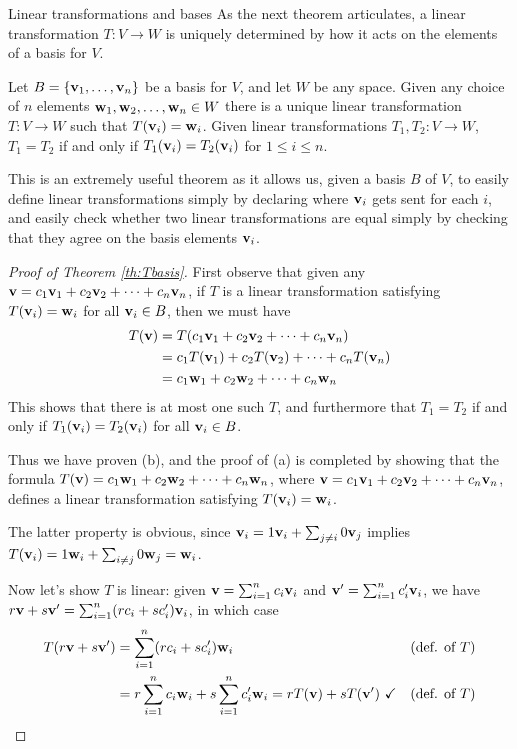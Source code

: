 \begin{frame}{Linear transformations and bases}
As the next theorem articulates, a linear transformation $T\colon V\rightarrow W$ is \alert{uniquely determined} by how it acts on the elements of a basis for $V$. 
\begin{theorem}\label{th:Tbasis}
Let $B=\{{\mathbf v}_1,\dots,{\mathbf v}_n\}$ be a basis for $V$, and let $W$ be any space. 
\bb[(a)]
\ii Given any choice of $n$ elements ${\mathbf w}_1,{\mathbf w}_2,\dots, {\mathbf w}_n\in W$ there is a \alert{unique} linear transformation $T\colon V\rightarrow W$ such that $T({\mathbf v}_i)={\mathbf w}_i$. 
\ii Given linear transformations $T_1,T_2\colon V\rightarrow W$, $T_1=T_2$ if and only if $T_1({\mathbf v}_i)=T_2({\mathbf v}_i)$ for $1\leq i\leq n$.  
\ee
\end{theorem}
\pause
This is an extremely useful theorem as it allows us, given a basis $B$ of $V$, to 
\bb[(i)]
\ii easily define linear transformations simply by declaring where ${\mathbf v}_i$ gets sent for each $i$, and 
\pause \ii easily check whether two linear transformations are equal simply by checking that they agree on the basis elements ${\mathbf v}_i$. 
\ee
\end{frame}
\begin{frame}
 \begin{proof}[Proof of Theorem \ref{th:Tbasis}]
 \footnotesize
 \pause 
 First observe that given any ${\mathbf v}=c_1{\mathbf v}_1+c_2{\mathbf v}_2+\cdots +c_n{\mathbf v}_n$, if $T$ is a linear transformation satisfying $T({\mathbf v}_i)={\mathbf w}_i$ for all ${\mathbf v}_i\in B$, then we must have 
 \begin{align*}
 T({\mathbf v})&=T(c_1{\mathbf v}_1+c_2{\mathbf v}_2+\cdots +c_n{\mathbf v}_n)\\
 &=c_1T({\mathbf v}_1)+c_2T({\mathbf v}_2)+\cdots +c_nT({\mathbf v}_n)\\
 &=c_1{\mathbf w}_1+c_2{\mathbf w}_2+\cdots +c_n{\mathbf w}_n
 \end{align*}
 This shows that there is \alert{at most} one such $T$, and furthermore that $T_1=T_2$ if and only if $T_1({\mathbf v}_i)=T_2({\mathbf v}_i)$ for all ${\mathbf v}_i\in B$. 
 \pause
 
 Thus we have proven (b), and the proof of (a) is completed by showing that the formula $T({\mathbf v})=c_1{\mathbf w}_1+c_2{\mathbf w}_2+\cdots +c_n{\mathbf w}_n$, where ${\mathbf v}=c_1{\mathbf v}_1+c_2{\mathbf v}_2+\cdots +c_n{\mathbf v}_n$, defines a linear transformation satisfying $T({\mathbf v}_i)={\mathbf w}_i$. 
 \pause
 
 The latter property is obvious, since ${\mathbf v}_i=1{\mathbf v}_i+\sum_{j\ne i}0{\mathbf v}_j$ implies $T({\mathbf v}_i)=1{\mathbf w}_i+\sum_{i\ne j}0{\mathbf w}_j={\mathbf w}_i$.
 \pause
 
 Now let's show $T$ is linear: given ${\mathbf v}=\sum_{i=1}^n c_i{\mathbf v}_i$ and ${\mathbf v}'=\sum_{i=1}^nc_i'{\mathbf v}_i$, we have $r{\mathbf v}+s{\mathbf v}'=\sum_{i=1}^n(rc_i+sc_i'){\mathbf v}_i$, in which case 
 \begin{align*}\setlength{\topsep}{0pt}
 T(r\boldv+s\boldv')&=\sum_{i=1}^n(rc_i+sc_i')\boldw_i &\text{(def. of $T$)}\\
 &=r\sum_{i=1}^n c_i\boldw_i+s\sum_{i=1}^nc_i'\boldw_i=rT(\boldv)+sT(\boldv')\ \checkmark &\text{(def. of $T$)}
 \end{align*}
 \end{proof}
\end{frame}
